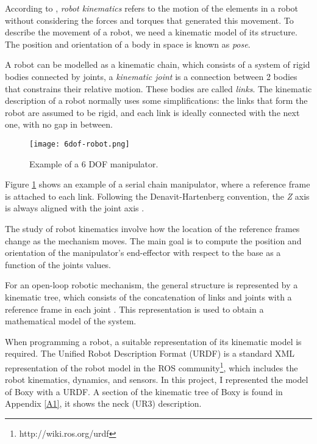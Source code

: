 According to \citet{Handbook}, \textit{robot kinematics} refers to the motion of the elements in a robot without considering the forces and torques that generated this movement. 
To describe the movement of a robot, we need a kinematic model of its structure. The position and orientation of a body  in space is known as \textit{pose}.

A robot can be modelled as a kinematic chain, which consists of a system of rigid bodies connected by joints, a \textit{kinematic joint} is a connection between 2 bodies that constrains their relative motion. These bodies are called \textit{links}.  The kinematic description of a robot normally uses some simplifications: the links that form the robot are assumed to be rigid, and each link is ideally connected with the next one, with no gap in between.
\begin{figure}[H]
	\centering
	\texttt{[image: 6dof-robot.png]}
	\vspace{-10pt}
	\caption{Example of a 6 DOF manipulator. \citep[chap. 1, page 24]{Handbook}}
	\vspace{-15pt}
	\label{fig:kinematic}
\end{figure}

Figure \ref{fig:kinematic} shows an example of a serial chain manipulator, where a reference frame is attached to each link. Following the Denavit-Hartenberg convention, the \textit{Z} axis is always aligned with the joint axis \citep{Craig}.

The study of robot kinematics involve how the location of the reference frames change as the mechanism moves. The main goal is to compute the position and orientation of the manipulator's end-effector with respect to the base as a function of the joints values.

For an open-loop robotic mechanism, the general structure is represented by a kinematic tree, which consists of the concatenation of links and joints with a reference frame in each joint \citep{Handbook}. This representation is used to obtain a mathematical model of the system. 

When programming a robot, a suitable representation of its kinematic model is required. The Unified Robot Description Format (URDF) is a standard XML representation of the robot model in the ROS community\footnote{http://wiki.ros.org/urdf}, which includes the robot kinematics, dynamics, and sensors. In this project, I represented the model of Boxy with a URDF. A section of the kinematic tree of Boxy is found in Appendix \ref{A1}, it shows the neck (UR3) description.

